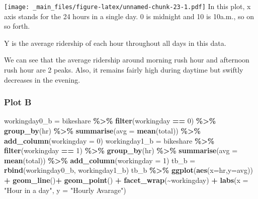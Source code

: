 \documentclass[
]{article}
\newenvironment{Shaded}{\begin{snugshade}}{\end{snugshade}}
\newcommand{\AttributeTok}[1]{\textcolor[rgb]{0.13,0.29,0.53}{#1}}
\newcommand{\DecValTok}[1]{\textcolor[rgb]{0.00,0.00,0.81}{#1}}
\newcommand{\FunctionTok}[1]{\textcolor[rgb]{0.13,0.29,0.53}{\textbf{#1}}}
\newcommand{\NormalTok}[1]{#1}
\newcommand{\OtherTok}[1]{\textcolor[rgb]{0.56,0.35,0.01}{#1}}
\newcommand{\SpecialCharTok}[1]{\textcolor[rgb]{0.81,0.36,0.00}{\textbf{#1}}}
\newcommand{\StringTok}[1]{\textcolor[rgb]{0.31,0.60,0.02}{#1}}
\begin{document}
\texttt{[image: \_main\_files/figure-latex/unnamed-chunk-23-1.pdf]}
In this plot, x axis stands for the 24 hours in a single day. 0 is midnight and 10 is 10a.m., so on so forth.

Y is the average ridership of each hour throughout all days in this data.

We can see that the average ridership around morning rush hour and afternoon rush hour are 2 peaks. Also, it remains fairly high during daytime but swiftly decreases in the evening.

\hypertarget{plot-b}{%
\subsubsection{Plot B}\label{plot-b}}

\begin{Shaded}
\begin{Highlighting}[]
\NormalTok{workingday0\_b }\OtherTok{=}\NormalTok{ bikeshare }\SpecialCharTok{\%\textgreater{}\%} \FunctionTok{filter}\NormalTok{(workingday }\SpecialCharTok{==} \DecValTok{0}\NormalTok{) }\SpecialCharTok{\%\textgreater{}\%} \FunctionTok{group\_by}\NormalTok{(hr) }\SpecialCharTok{\%\textgreater{}\%} \FunctionTok{summarise}\NormalTok{(}\AttributeTok{avg =} \FunctionTok{mean}\NormalTok{(total)) }\SpecialCharTok{\%\textgreater{}\%} \FunctionTok{add\_column}\NormalTok{(}\AttributeTok{workingday =} \DecValTok{0}\NormalTok{)}
\NormalTok{workingday1\_b }\OtherTok{=}\NormalTok{ bikeshare }\SpecialCharTok{\%\textgreater{}\%} \FunctionTok{filter}\NormalTok{(workingday }\SpecialCharTok{==} \DecValTok{1}\NormalTok{) }\SpecialCharTok{\%\textgreater{}\%} \FunctionTok{group\_by}\NormalTok{(hr) }\SpecialCharTok{\%\textgreater{}\%} \FunctionTok{summarise}\NormalTok{(}\AttributeTok{avg =} \FunctionTok{mean}\NormalTok{(total)) }\SpecialCharTok{\%\textgreater{}\%} \FunctionTok{add\_column}\NormalTok{(}\AttributeTok{workingday =} \DecValTok{1}\NormalTok{)}
\NormalTok{tb\_b }\OtherTok{=} \FunctionTok{rbind}\NormalTok{(workingday0\_b, workingday1\_b)}
\NormalTok{tb\_b }\SpecialCharTok{\%\textgreater{}\%} \FunctionTok{ggplot}\NormalTok{(}\FunctionTok{aes}\NormalTok{(}\AttributeTok{x=}\NormalTok{hr,}\AttributeTok{y=}\NormalTok{avg)) }\SpecialCharTok{+} \FunctionTok{geom\_line}\NormalTok{()}\SpecialCharTok{+} \FunctionTok{geom\_point}\NormalTok{() }\SpecialCharTok{+} \FunctionTok{facet\_wrap}\NormalTok{(}\SpecialCharTok{\textasciitilde{}}\NormalTok{workingday) }\SpecialCharTok{+} \FunctionTok{labs}\NormalTok{(}\AttributeTok{x =} \StringTok{"Hour in a day"}\NormalTok{, }\AttributeTok{y =} \StringTok{"Hourly Avarage"}\NormalTok{)}
\end{Highlighting}
\end{Shaded}
\end{document}
